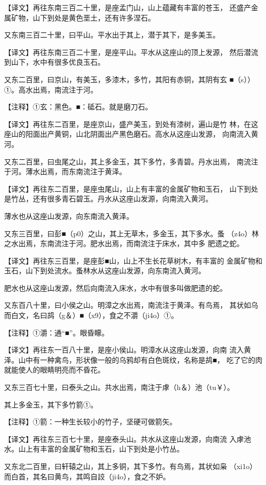 \documentclass[a4paper,12pt,UTF8,twoside]{ctexbook}
\begin{document}
【译文】再往东南三百二十里，是座孟门山，山上蕴藏有丰富的苍玉， 还盛产金属矿物，山下到处是黄色垩土，还有许多涅石。

又东南三百二十里，曰平山。平水出于其上，潜于其下，是多美玉。

【译文】再往东南三百二十里，是座平山。平水从这座山的顶上发源， 然后潜流到山下，水中有很多优良玉石。

又东二百里，曰京山，有美玉，多漆木，多竹，其阳有赤铜，其阴有玄 ■（s））①。高水出焉，南流注于河。

【注释】①玄：黑色。■：砥石。就是磨刀石。

【译文】再往东二百里，是座京山，盛产美玉，到处有漆树，遍山是竹 林，在这座山的阳面出产黄铜，山北阴面出产黑色磨石。高水从这座山发源， 向南流入黄河。

又东二百里，曰虫尾之山，其上多金玉，其下多竹，多青碧。丹水出焉， 南流注于河。薄水出焉，而东南流注于黄泽。

【译文】再往东二百里，是座虫尾山，山上有丰富的金属矿物和玉石， 山下到处是竹丛，还有很多青石碧玉。丹水从这座山发源，向南流入黄河。

薄水也从这座山发源，向东南流入黄泽。

又东三百里，曰彭■（p0）之山，其上无草木，多金玉，其下多水。蚤 （z4o）林之水出焉，东南流注于河。肥水出焉，而南流注于床水，其中多 肥遗之蛇。

【译文】再往东三百里，是座彭■山，山上不生长花草树木，有丰富的 金属矿物和玉石，山下到处流水。蚤林水从这座山发源，向东南流入黄河。

肥水也从这座山发源，然后向南流入床水，水中有很多叫做肥遗的蛇。

又东百八十里，曰小侯之山。明漳之水出焉，南流注于黄泽。有鸟焉， 其状如乌而白文，名曰鸪（g＆）■（x9），食之不灂（ji4o）①。

【注释】①灂：通“■”。眼昏矇。

【译文】再往东一百八十里，是座小侯山。明漳水从这座山发源，向南 流入黄泽。山中有一种禽鸟，形状像一般的乌鸦却有白色斑纹，名称是鸪■， 吃了它的肉就能使人的眼睛明亮而不昏花。

又东三百七十里，曰泰头之山。共水出焉，南注于虖（h＆）池（tu￥）。

其上多金玉，其下多竹箭①。

【注释】①箭：一种生长较小的竹子，坚硬可做箭矢。

【译文】再往东三百七十里，是座泰头山。共水从这座山发源，向南流 入虖池水。山上有丰富的金属矿物和玉石，山下到处是小竹丛。

又东北二百里，曰轩辕之山，其上多铜，其下多竹。有鸟焉，其状如枭 （xi1o）而白首，其名曰黄鸟，其鸣自詨（ji4o），食之不妒。
\end{document}
